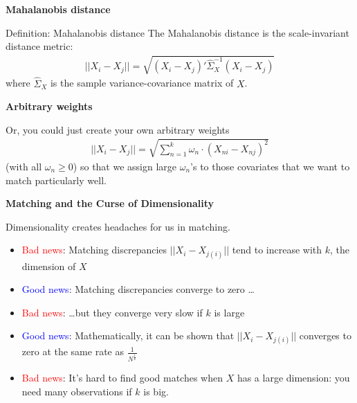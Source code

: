 \documentclass[notes=show]{beamer}
\begin{document}
\begin{frame}[plain]
	\begin{center}
	\textbf{Mahalanobis distance}
	\end{center}
	
	\begin{block}{Definition: Mahalanobis distance}
	The Mahalanobis distance is the scale-invariant distance metric:
		\begin{eqnarray*}
		||X_i-X_j|| = \sqrt{ (X_i-X_j)'\widehat{\Sigma}_X^{-1}(X_i - X_j) }
		\end{eqnarray*}
	where $\widehat{\Sigma}_X$ is the sample variance-covariance matrix of $X$.
	\end{block}


\end{frame}


\begin{frame}[plain]
	\begin{center}
	\textbf{Arbitrary weights}
	\end{center}
	
	Or, you could just create your own arbitrary weights
		\begin{eqnarray*}
		||X_i-X_j|| = \sqrt{ \sum_{n=1}^k \omega_n \cdot (X_{ni} - X_{nj})^2}
		\end{eqnarray*}(with all $\omega_n\geq{0}$) so that we assign large $\omega_n$'s to those covariates that we want to match particularly well.

\end{frame}

\begin{frame}[plain]
	\begin{center}
	\textbf{Matching and the Curse of Dimensionality}
	\end{center}
	
Dimensionality creates headaches for us in matching.
	\begin{itemize}
	\item \textcolor{red}{Bad news}: Matching discrepancies $||X_i-X_{j(i)}||$ tend to increase with $k$, the dimension of $X$
	\item \textcolor{blue}{Good news}: Matching discrepancies converge to zero \dots
	\item \textcolor{red}{Bad news}: \dots but they converge very slow if $k$ is large
	\item \textcolor{blue}{Good news}: Mathematically, it can be shown that $||X_i-X_{j(i)}||$ converges to zero at the same rate as $\frac{1}{N^{\frac{1}{k}}}$
	\item \textcolor{red}{Bad news}: It's hard to find good matches when $X$ has a large dimension:  you need many observations if $k$ is big.
	\end{itemize}
\end{frame}
\end{document}
